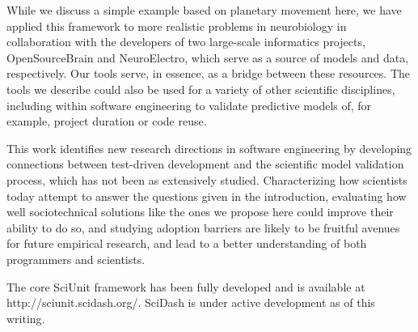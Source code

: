 \documentclass[9pt]{sig-alternate}
\begin{document}
While we discuss a simple example based on planetary movement here, we have applied this framework to more realistic problems in neurobiology in collaboration with the developers of two large-scale informatics projects, OpenSourceBrain and NeuroElectro, which serve as a source of models and data, respectively. Our tools serve, in essence, as a bridge between these resources. The tools we describe could also be used for a variety of other scientific disciplines, including within software engineering to validate predictive models of, for example, project duration or code reuse.

This work identifies new research directions in software engineering by developing connections between test-driven development \cite{beck2003} and the scientific model validation process, which has not been as extensively studied. Characterizing how scientists today attempt to answer the questions given in the introduction, evaluating how well sociotechnical solutions like the ones we propose here could improve their ability to do so, and studying adoption barriers are likely to be fruitful avenues for future empirical research, and lead to a better understanding of both programmers and scientists. 

The core SciUnit framework has been fully developed and is available at http://sciunit.scidash.org/. SciDash is under active development as of this writing.
\vspace{5px}
\end{document}
